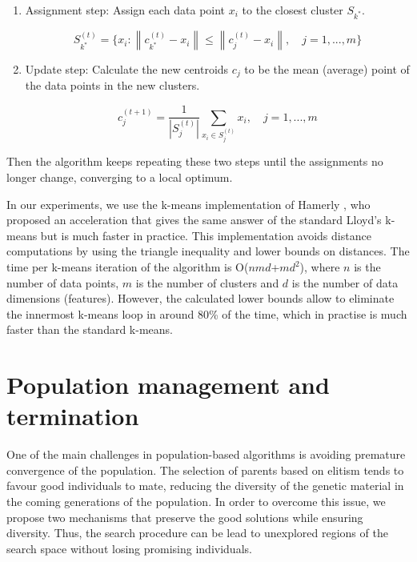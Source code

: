\begin{enumerate}

	\item Assignment step: Assign each data point $x_i$ to the closest cluster $S_{k^{*}}$.
	
	\begin{equation}
	S_{k^{*}}^{(t)} = \{ x_i: \left \| c_{k^{*}}^{(t)} - x_i \right \| \leq  \left \| c_{j}^{(t)} - x_i \right \|, \quad j = 1, ..., m \}
	\end{equation}
	
	\item Update step: Calculate the new centroids $c_j$ to be the mean (average) point of the data points in the new clusters.
	
	\begin{equation}
	c_{j}^{(t+1)} = \frac{1}{\left | S_{j}^{(t)} \right |} \sum_{x_i \in S_{j}^{(t)}} x_i, \quad j = 1, ..., m
	\end{equation}
		
\end{enumerate}

Then the algorithm keeps repeating these two steps until the assignments no longer change, converging to a local optimum.

In our experiments, we use the k-means implementation of Hamerly \cite{Hamerly2010}, who proposed an acceleration that gives the same answer of the standard Lloyd's k-means \cite{Lloyd1982} but is much faster in practice. This implementation avoids distance computations by using the triangle inequality and lower bounds on distances. The time per k-means iteration of the algorithm is O($nmd$+$md^2$), where $n$ is the number of data points, $m$ is the number of clusters and $d$ is the number of data dimensions (features). However, the calculated lower bounds allow to eliminate the innermost k-means loop in around 80\% of the time, which in practise is much faster than the standard k-means.

\section{Population management and termination}
\label{sec:population-management}
One of the main challenges in population-based algorithms is avoiding premature convergence of the population. The selection of parents based on elitism tends to favour good individuals to mate, reducing the diversity of the genetic material in the coming generations of the population. In order to overcome this issue, we propose two mechanisms that preserve the good solutions while ensuring diversity. Thus, the search procedure can be lead to unexplored regions of the search space without losing promising individuals.

